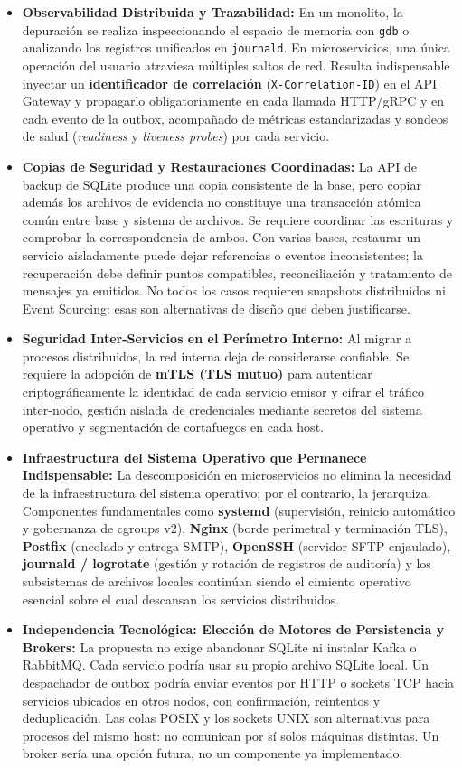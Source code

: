 \documentclass[10pt,a4paper]{article}
\begin{document}
\begin{itemize}[leftmargin=*]
    \item \textbf{Observabilidad Distribuida y Trazabilidad:} En un monolito, la depuración se realiza inspeccionando el espacio de memoria con \texttt{gdb} o analizando los registros unificados en \texttt{journald}. En microservicios, una única operación del usuario atraviesa múltiples saltos de red. Resulta indispensable inyectar un \textbf{identificador de correlación} (\texttt{X-Correlation-ID}) en el API Gateway y propagarlo obligatoriamente en cada llamada HTTP/gRPC y en cada evento de la outbox, acompañado de métricas estandarizadas y sondeos de salud (\textit{readiness} y \textit{liveness probes}) por cada servicio.
    \item \textbf{Copias de Seguridad y Restauraciones Coordinadas:} La API de backup de SQLite produce una copia consistente de la base, pero copiar además los archivos de evidencia no constituye una transacción atómica común entre base y sistema de archivos. Se requiere coordinar las escrituras y comprobar la correspondencia de ambos. Con varias bases, restaurar un servicio aisladamente puede dejar referencias o eventos inconsistentes; la recuperación debe definir puntos compatibles, reconciliación y tratamiento de mensajes ya emitidos. No todos los casos requieren snapshots distribuidos ni Event Sourcing: esas son alternativas de diseño que deben justificarse.
    \item \textbf{Seguridad Inter-Servicios en el Perímetro Interno:} Al migrar a procesos distribuidos, la red interna deja de considerarse confiable. Se requiere la adopción de \textbf{mTLS (TLS mutuo)} para autenticar criptográficamente la identidad de cada servicio emisor y cifrar el tráfico inter-nodo, gestión aislada de credenciales mediante secretos del sistema operativo y segmentación de cortafuegos en cada host.
    \item \textbf{Infraestructura del Sistema Operativo que Permanece Indispensable:} La descomposición en microservicios no elimina la necesidad de la infraestructura del sistema operativo; por el contrario, la jerarquiza. Componentes fundamentales como \textbf{systemd} (supervisión, reinicio automático y gobernanza de cgroups v2), \textbf{Nginx} (borde perimetral y terminación TLS), \textbf{Postfix} (encolado y entrega SMTP), \textbf{OpenSSH} (servidor SFTP enjaulado), \textbf{journald / logrotate} (gestión y rotación de registros de auditoría) y los subsistemas de archivos locales continúan siendo el cimiento operativo esencial sobre el cual descansan los servicios distribuidos.
    \item \textbf{Independencia Tecnológica: Elección de Motores de Persistencia y Brokers:} La propuesta no exige abandonar SQLite ni instalar Kafka o RabbitMQ. Cada servicio podría usar su propio archivo SQLite local. Un despachador de outbox podría enviar eventos por HTTP o sockets TCP hacia servicios ubicados en otros nodos, con confirmación, reintentos y deduplicación. Las colas POSIX y los sockets UNIX son alternativas para procesos del mismo host: no comunican por sí solos máquinas distintas. Un broker sería una opción futura, no un componente ya implementado.
\end{itemize}
\end{document}
